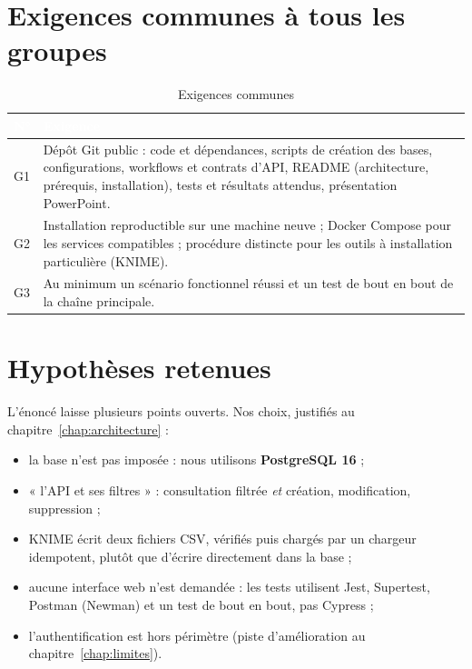 \section{Exigences communes à tous les groupes}
\begin{table}[H]
\centering\small
\caption{Exigences communes}
\begin{tabularx}{\linewidth}{|l|X|}
\hline
\rowcolor{bluedark}\textcolor{white}{\textbf{N°}} & \textcolor{white}{\textbf{Exigence}} \\
\hline
G1 & Dépôt Git public : code et dépendances, scripts de création des bases, configurations, workflows et contrats d'API, README (architecture, prérequis, installation), tests et résultats attendus, présentation PowerPoint. \\
\hline
G2 & Installation reproductible sur une machine neuve ; Docker Compose pour les services compatibles ; procédure distincte pour les outils à installation particulière (KNIME). \\
\hline
G3 & Au minimum un scénario fonctionnel réussi et un test de bout en bout de la chaîne principale. \\
\hline
\end{tabularx}
\end{table}

\section{Hypothèses retenues}
L'énoncé laisse plusieurs points ouverts. Nos choix, justifiés au chapitre~\ref{chap:architecture} :
\begin{itemize}
  \item la base n'est pas imposée : nous utilisons \textbf{PostgreSQL 16} ;
  \item « l'API et ses filtres » : consultation filtrée \emph{et} création, modification, suppression ;
  \item KNIME écrit deux fichiers CSV, vérifiés puis chargés par un chargeur idempotent, plutôt que d'écrire directement dans la base ;
  \item aucune interface web n'est demandée : les tests utilisent Jest, Supertest, Postman (Newman) et un test de bout en bout, pas Cypress ;
  \item l'authentification est hors périmètre (piste d'amélioration au chapitre~\ref{chap:limites}).
\end{itemize}

